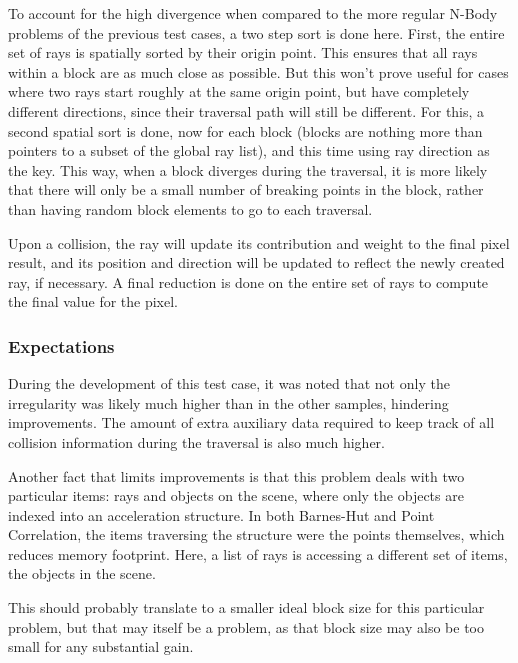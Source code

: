 To account for the high divergence when compared to the more regular N-Body problems of the previous test cases, a two step sort is done here. First, the entire set of rays is spatially sorted by their origin point. This ensures that all rays within a block are as much close as possible. But this won't prove useful for cases where two rays start roughly at the same origin point, but have completely different directions, since their traversal path will still be different. For this, a second spatial sort is done, now for each block (blocks are nothing more than pointers to a subset of the global ray list), and this time using ray direction as the key.
This way, when a block diverges during the traversal, it is more likely that there will only be a small number of breaking points in the block, rather than having random block elements to go to each traversal.

Upon a collision, the ray will update its contribution and weight to the final pixel result, and its position and direction will be updated to reflect the newly created ray, if necessary. A final reduction is done on the entire set of rays to compute the final value for the pixel.

\subsubsection{Expectations}

During the development of this test case, it was noted that not only the irregularity was likely much higher than in the other samples, hindering improvements. The amount of extra auxiliary data required to keep track of all collision information during the traversal is also much higher.

Another fact that limits improvements is that this problem deals with two particular items: rays and objects on the scene, where only the objects are indexed into an acceleration structure. In both Barnes-Hut and Point Correlation, the items traversing the structure were the points themselves, which reduces memory footprint. Here, a list of rays is accessing a different set of items, the objects in the scene.

This should probably translate to a smaller ideal block size for this particular problem, but that may itself be a problem, as that block size may also be too small for any substantial gain. 


